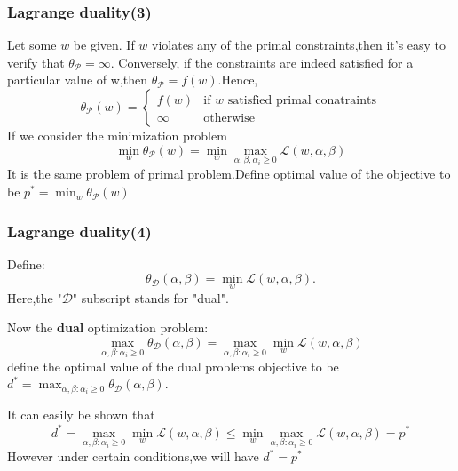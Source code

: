 \documentclass[slidestop,compress,mathserif]{beamer}
\begin{document}
    \begin{frame}
        \frametitle{Lagrange duality(3)}
        Let some $w$ be given. If $w$ violates any of the primal constraints,then it's easy to verify that $\theta_\mathcal{P}=\infty$. Conversely, if the constraints are indeed satisfied for a particular value of w,then $\theta_\mathcal{P}=f (w)$.Hence,
        $$\theta_\mathcal{P}(w)=\left\{\begin{array}{ll}
                        f(w)  & \mbox{if $w$ satisfied primal conatraints}\\
                        \infty  &\mbox{otherwise}
                        \end{array}
                        \right.
        $$
        If we consider the minimization problem
        $$\min_w\theta_\mathcal{P}(w)=\min_w\max_{\alpha,\beta,\alpha_i\ge 0} \mathcal{L}(w,\alpha,\beta)$$
        It is the same problem of primal problem.Define optimal value of the objective to be $p^*=\min_w\theta_\mathcal{P}(w)$
    \end{frame}
    \begin{frame}
        \frametitle{Lagrange duality(4)}
        Define:
        $$\theta_\mathcal{D}(\alpha,\beta)=\min_w\mathcal{L}(w,\alpha,\beta).$$
        Here,the "$\mathcal{D}$" subscript stands for "dual".

        Now the \textbf{dual} optimization problem:
        $$\max_{\alpha,\beta:\alpha_i \ge 0}\theta_\mathcal{D}(\alpha,\beta)=\max_{\alpha,\beta:\alpha_i \ge 0}\min_w\mathcal{L}(w,\alpha,\beta)$$
        define the optimal value of the dual problems objective to be $d^*=\max_{\alpha,\beta:\alpha_i \ge 0}\theta_\mathcal{D}(\alpha,\beta)$.

        It can easily be shown that
        $$d^*=\max_{\alpha,\beta:\alpha_i\ge 0}\min_w\mathcal{L}(w,\alpha,\beta) \le \min_w\max_{\alpha,\beta:\alpha_i\ge 0}\mathcal{L}(w,\alpha,\beta)=p^*$$
        However under certain conditions,we will have $d^*=p^*$
    \end{frame}
\end{document}
